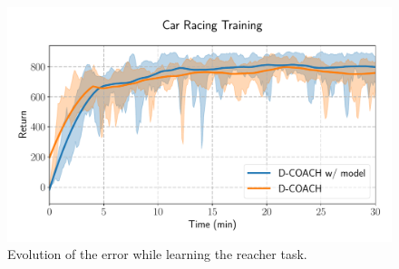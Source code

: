 \begin{figure}[t]
    \centering
    \includegraphics[width=0.9\linewidth]{imagenes/cap3/car_racing_lstm.pdf}
    \caption{Evolution of the error while learning the reacher task. }
    \label{fig:reacher_exp}
\end{figure}